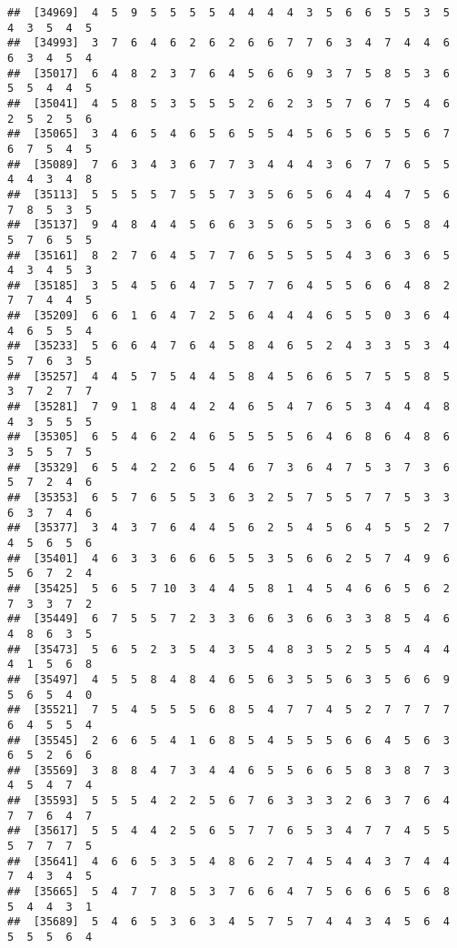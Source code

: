 \documentclass[
]{book}
\begin{document}
\begin{verbatim}
##  [34969]  4  5  9  5  5  5  5  4  4  4  4  3  5  6  6  5  5  3  5  4  3  5  4  5
##  [34993]  3  7  6  4  6  2  6  2  6  6  7  7  6  3  4  7  4  4  6  6  3  4  5  4
##  [35017]  6  4  8  2  3  7  6  4  5  6  6  9  3  7  5  8  5  3  6  5  5  4  4  5
##  [35041]  4  5  8  5  3  5  5  5  2  6  2  3  5  7  6  7  5  4  6  2  5  2  5  6
##  [35065]  3  4  6  5  4  6  5  6  5  5  4  5  6  5  6  5  5  6  7  6  7  5  4  5
##  [35089]  7  6  3  4  3  6  7  7  3  4  4  4  3  6  7  7  6  5  5  4  4  3  4  8
##  [35113]  5  5  5  5  7  5  5  7  3  5  6  5  6  4  4  4  7  5  6  7  8  5  3  5
##  [35137]  9  4  8  4  4  5  6  6  3  5  6  5  5  3  6  6  5  8  4  5  7  6  5  5
##  [35161]  8  2  7  6  4  5  7  7  6  5  5  5  5  4  3  6  3  6  5  4  3  4  5  3
##  [35185]  3  5  4  5  6  4  7  5  7  7  6  4  5  5  6  6  4  8  2  7  7  4  4  5
##  [35209]  6  6  1  6  4  7  2  5  6  4  4  4  6  5  5  0  3  6  4  4  6  5  5  4
##  [35233]  5  6  6  4  7  6  4  5  8  4  6  5  2  4  3  3  5  3  4  5  7  6  3  5
##  [35257]  4  4  5  7  5  4  4  5  8  4  5  6  6  5  7  5  5  8  5  3  7  2  7  7
##  [35281]  7  9  1  8  4  4  2  4  6  5  4  7  6  5  3  4  4  4  8  4  3  5  5  5
##  [35305]  6  5  4  6  2  4  6  5  5  5  5  6  4  6  8  6  4  8  6  3  5  5  7  5
##  [35329]  6  5  4  2  2  6  5  4  6  7  3  6  4  7  5  3  7  3  6  5  7  2  4  6
##  [35353]  6  5  7  6  5  5  3  6  3  2  5  7  5  5  7  7  5  3  3  6  3  7  4  6
##  [35377]  3  4  3  7  6  4  4  5  6  2  5  4  5  6  4  5  5  2  7  4  5  6  5  6
##  [35401]  4  6  3  3  6  6  6  5  5  3  5  6  6  2  5  7  4  9  6  5  6  7  2  4
##  [35425]  5  6  5  7 10  3  4  4  5  8  1  4  5  4  6  6  5  6  2  7  3  3  7  2
##  [35449]  6  7  5  5  7  2  3  3  6  6  3  6  6  3  3  8  5  4  6  4  8  6  3  5
##  [35473]  5  6  5  2  3  5  4  3  5  4  8  3  5  2  5  5  4  4  4  4  1  5  6  8
##  [35497]  4  5  5  8  4  8  4  6  5  6  3  5  5  6  3  5  6  6  9  5  6  5  4  0
##  [35521]  7  5  4  5  5  5  6  8  5  4  7  7  4  5  2  7  7  7  7  6  4  5  5  4
##  [35545]  2  6  6  5  4  1  6  8  5  4  5  5  5  6  6  4  5  6  3  6  5  2  6  6
##  [35569]  3  8  8  4  7  3  4  4  6  5  5  6  6  5  8  3  8  7  3  4  5  4  7  4
##  [35593]  5  5  5  4  2  2  5  6  7  6  3  3  3  2  6  3  7  6  4  7  7  6  4  7
##  [35617]  5  5  4  4  2  5  6  5  7  7  6  5  3  4  7  7  4  5  5  5  7  7  7  5
##  [35641]  4  6  6  5  3  5  4  8  6  2  7  4  5  4  4  3  7  4  4  7  4  3  4  5
##  [35665]  5  4  7  7  8  5  3  7  6  6  4  7  5  6  6  6  5  6  8  5  4  4  3  1
##  [35689]  5  4  6  5  3  6  3  4  5  7  5  7  4  4  3  4  5  6  4  5  5  5  6  4

\end{verbatim}
\end{document}
